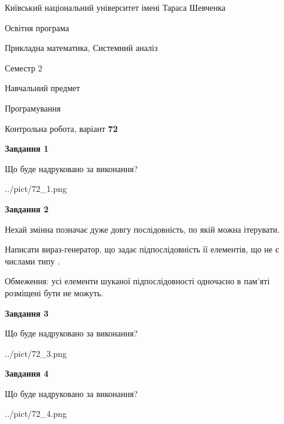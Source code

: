 \documentclass[12pt, ukrainian]{article}
\begin{document}
{{\begin {small}\par
{ \center  Київський національний університет імені Тараса Шевченка \par}
{\parbox {5 cm}{Освітня програма \hfill}{\parbox {8 cm}{Прикладна математика, Системний аналіз \hfill}}\parbox {5 cm}{\hfill Семестр 2}}\par
{\parbox {5 cm} {Навчальний предмет \hfill}\parbox {7 cm}{Програмування \hfill}\parbox {6cm}{\hfill}\par}\vspace{-7pt} \end{small}}{\center Контрольна робота, варіант  \No \textbf
{ 72 }\par}}
{
\begin {large}
{\begin {center}\textbf{Завдання 1}\end {center}}\par
Що буде надруковано за виконання?\par\par
\begin{center}
	{../pict/72_1.png}
\end{center}
\newpage

{\begin {center}\textbf{Завдання 2}\end {center}}\par
Нехай змінна  позначає дуже довгу послідовність, по якій можна ітерувати.

Написати вираз-генератор, що задає підпослідовність її елементів, що не є числами типу .

Обмеження: усі елементи шуканої підпослідовності одночасно в пам'яті розміщені бути не можуть.\par
\newpage

{\begin {center}\textbf{Завдання 3}\end {center}}\par
Що буде надруковано за виконання?\par
\begin{center}
	{../pict/72_3.png}
\end{center}
\newpage

{\begin {center}\textbf{Завдання 4}\end {center}}\par
Що буде надруковано за виконання?\par
\begin{center}
	{../pict/72_4.png}
\end{center}
\newpage


\end{large}}
\end{document}
